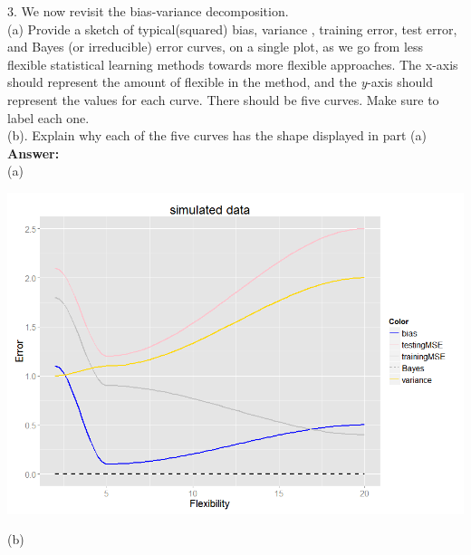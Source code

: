 \documentclass[12pt]{article}
\begin{document}
3. We now revisit the bias-variance decomposition.\\
(a) Provide a sketch of typical(squared) bias, variance , training error, test error, and Bayes (or irreducible) error curves, on a single plot, as we go from less flexible statistical learning methods towards more flexible approaches. The x-axis should represent the amount of flexible in the method, and the \textit{y}-axis should represent the values for each curve. There should be five curves. Make sure to label each one.\\
(b). Explain why each of the five curves has the shape displayed in part (a) \\
\textbf{Answer:}\\
(a)\\
 \begin{center}
 
 \includegraphics[scale=0.6]{3a.png}
 \end{center}
(b)\\
\end{document}
